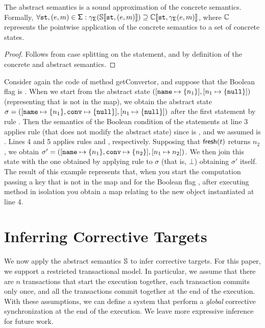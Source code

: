 \begin{lemma}
	\label{lemma:soundnessabstractsemantics}
	The abstract semantics is a sound approximation of the concrete semantics. Formally, $\forall \mathtt{st}, (e, m) \in \mathsf{\Sigma}: \gamma_{\mathsf{\Sigma}}(\mathbb{S}\llbracket \mathtt{st}, (e, m) \rrbracket) \supseteq \mathbb{C}\llbracket \mathtt{st}, \gamma_{\mathsf{\Sigma}}(e, m) \rrbracket$, where $\mathbb{C}$ represents the pointwise application of the concrete semantics to a set of concrete states.
\begin{proof}
Follows from case splitting on the statement, and by definition of the concrete and abstract semantics.
\end{proof}
\end{lemma}

\runex
Consider again the code of method {\sf getConvertor}, and suppose that the Boolean flag  is . When we start from the abstract state  $([\mathtt{name} \mapsto \{n_1\}], [n_1 \mapsto \{\mathtt{null}\}])$ (representing that  is not in the map), we obtain the abstract state $\sigma = ([\mathtt{name} \mapsto \{n_1\}, \mathtt{conv} \mapsto \{\mathtt{null}\}], [n_1 \mapsto \{\mathtt{null}\}])$ after the first statement by rule . 
%
Then the semantics of the Boolean condition of the  statements at line 3 applies rule  (that does not modify the abstract state) since  is , and we assumed  is . 
Lines 4 and 5 applies rules  and , respectively. Supposing that $\mathsf{fresh}(t)$ returns $n_2$, we obtain $\sigma'=([\mathtt{name} \mapsto \{n_1\}, \mathtt{conv} \mapsto \{n_2\}], [n_1 \mapsto n_2])$. We then join this state with the one obtained by applying rule  to $\sigma$ (that is, $\bot$) obtaining $\sigma'$ itself.
%
The result of this example represents that, when you start the computation passing a key  that is not in the map and  for the Boolean flag , after executing method  in isolation you obtain a map relating  to the new object instantiated at line 4.

\section{Inferring Corrective Targets}
\label{sec:transactionsystemwarping}
We now apply the abstract semantics $\mathbb{S}$ to infer corrective targets.
%
For this paper, we support a restricted transactional model. In particular, we assume that there are $n$ transactions that start the execution together, each transaction commits only once, and all the transactions commit together at the end of the execution. With these assumptions, we can define a system that perform a \emph{global} corrective synchronization at the end of the execution. We leave more expressive inference for future work.


